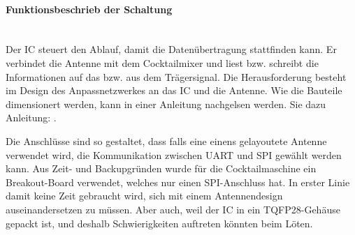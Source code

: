 \paragraph{Funktionsbeschrieb der Schaltung}\mbox{}\\

Der IC steuert den Ablauf, damit die Datenübertragung stattfinden kann. Er verbindet die Antenne mit dem Cocktailmixer und liest bzw. schreibt die Informationen auf das bzw. aus dem Trägersignal. Die Herausforderung besteht im Design des Anpassnetzwerkes an das IC und die Antenne. Wie die Bauteile dimensionert werden, kann in einer Anleitung nachgelsen werden. Sie dazu Anleitung: \cite{nxp_bv_2010_antenna_2010}.

Die Anschlüsse sind so gestaltet, dass falls eine einens gelayoutete Antenne verwendet wird, die Kommunikation zwischen UART und SPI gewählt werden kann. Aus Zeit- und Backupgründen wurde für die Cocktailmaschine ein Breakout-Board verwendet, welches nur einen SPI-Anschluss hat. In erster Linie damit keine Zeit gebraucht wird, sich mit einem Antennendesign auseinandersetzen zu müssen. Aber auch, weil der IC in ein TQFP28-Gehäuse gepackt ist, und deshalb Schwierigkeiten auftreten könnten beim Löten.